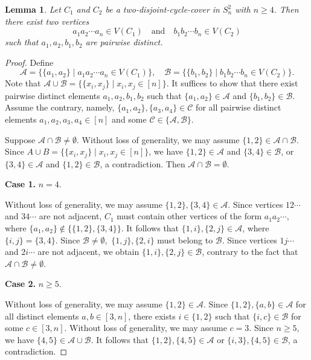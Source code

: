 \documentclass[12pt,a4paper]{amsart}
\newtheorem{lemma}[thm]{Lemma}
\theoremstyle{definition}
\begin{document}
\begin{lemma}\label{12}
Let $C_1$ and $C_2$ be a two-disjoint-cycle-cover in $S_{n}^{2}$ with $n\ge 4$.
Then there exist two vertices
\[
a_1a_2\cdots a_n\in V(C_1) \quad \text{and} \quad
b_1b_2\cdots b_n\in V(C_2)
\]
such that $a_1,a_2,b_1,b_2$ are pairwise distinct.
\end{lemma}

\begin{proof} Define
\[
\mathscr{A}=\{\{a_1,a_2\}\mid a_1a_2\cdots a_n\in V(C_1)\},\quad\mathscr{B}=\{\{b_1,b_2\}\mid b_1b_2\cdots b_n\in V(C_2)\}.
\] Note that $\mathscr{A}\cup\mathscr{B}=\{\{x_i,x_j\}\mid x_i,x_j\in[n]\}$. It suffices to show that there exist pairwise distinct elements $a_1,a_2,b_1,b_2$ such that $\{a_1,a_2\}\in\mathscr{A}$ and $\{b_1,b_2\}\in \mathscr{B}$. Assume the contrary, namely,  $\{a_1,a_2\},\{a_3,a_4\}\in\mathscr{C}$ for all pairwise distinct elements $a_1,a_2,a_3,a_4\in [n]$ and some $\mathscr{C}\in\{\mathscr{A},\mathscr{B}\}$.


Suppose $\mathscr{A}\cap\mathscr{B}\neq\emptyset$. Without loss of generality, we may assume $\{1,2\}\in\mathscr{A}\cap\mathscr{B}$. Since $A\cup B=\{\{x_i,x_j\}\mid x_i,x_j\in[n]\}$, we have $\{1,2\}\in\mathscr{A}$ and $\{3,4\}\in\mathscr{B}$, or $\{3,4\}\in\mathscr{A}$ and $\{1,2\}\in\mathscr{B}$, a contradiction. Then $\mathscr{A}\cap\mathscr{B}=\emptyset$.



\medskip
\noindent
\textbf{Case 1.} $n=4$.

Without loss of generality, we may assume $\{1,2\},\{3,4\}\in \mathscr{A}$.
Since vertices $12\cdots$ and $34\cdots$ are not adjacent, $C_1$ must contain other vertices of the form $a_1a_2\cdots$, where $\{a_1,a_2\}\notin\{\{1,2\},\{3,4\}\}$. It follows that $\{1,i\},\{2,j\}\in\mathscr{A}$, where $\{i,j\}=\{3,4\}$. Since $\mathscr{B}\neq\emptyset$,~$\{1,j\},\{2,i\}$ must belong to $\mathscr{B}$. Since vertices $1j\cdots$ and $2i\cdots$ are not adjacent, we obtain $\{1,i\},\{2,j\}\in \mathscr{B}$, contrary to the fact that $\mathscr{A}\cap \mathscr{B}\neq\emptyset$.

\medskip
\noindent
\textbf{Case 2.} $n\ge 5$.

Without loss of generality, we may assume $\{1,2\}\in\mathscr{A}$. Since $\{1,2\},\{a,b\}\in\mathscr{A}$ for all distinct elements $a,b\in [3,n]$, there exists $i\in\{1,2\}$ such that $\{i,c\}\in\mathscr{B}$ for some $c\in[3,n]$. Without loss of generality, we may assume $c=3$. Since $n\ge 5$, we have $\{4,5\}\in \mathscr{A}\cup \mathscr{B}$. It follows that $\{1,2\},\{4,5\}\in\mathscr{A}$ or $\{i,3\},\{4,5\}\in\mathscr{B}$, a contradiction.
\end{proof}
\end{document}

